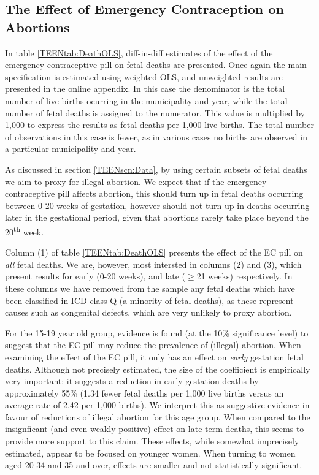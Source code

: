 \subsection{The Effect of Emergency Contraception on Abortions}
\label{TEENsscn:rabortion}
In table \ref{TEENtab:DeathOLS}, diff-in-diff estimates of the effect of the
emergency contraceptive pill on fetal deaths are presented.  Once again the main
specification is estimated using weighted OLS, and unweighted results are
presented in the online appendix. In this case the denominator is the total
number of live births ocurring in the municipality and year, while the total
number of fetal deaths is assigned to the numerator.  This value is multiplied
by 1,000 to express the results as fetal deaths per 1,000 live births. The total
number of observations in this case is fewer, as in various cases no births are
observed in a particular municipality and year.

As discussed in section \ref{TEENscn:Data}, by using certain subsets of fetal
deaths we aim to proxy for illegal abortion.  We expect that if the emergency
contraceptive pill affects abortion, this should turn up in fetal deaths
occurring between 0-20 weeks of gestation, however should not turn up in deaths
occurring later in the gestational period, given that abortions rarely take
place beyond the 20\textsuperscript{th} week.

Column (1) of table \ref{TEENtab:DeathOLS} presents the effect of the EC pill on
\emph{all} fetal deaths.  We are, however, most intersted in columns (2) and (3),
which present results for early (0-20 weeks), and late ($\geq$21 weeks) 
respectively.  In these columns we have removed from the sample any fetal deaths
which have been classified in ICD class Q (a minority of fetal deaths), as these 
represent causes such as congenital defects, which are very unlikely to proxy
abortion.

For the 15-19 year old group, evidence is found (at the 10\% significance level)
to suggest that the EC pill may reduce the prevalence of (illegal) abortion.
When examining the effect of the EC pill, it only has an effect on \emph{early}
gestation fetal deaths.  Although not precisely estimated, the size of the
coefficient is empirically very important: it suggests a reduction in early
gestation deaths by approximately 55\% (1.34 fewer fetal deaths per 1,000 live
births versus an average rate of 2.42 per 1,000 births). We interpret this as
suggestive evidence in favour of reductions of illegal abortion for this age
group.  When compared to the insignficant (and even weakly positive) effect on
late-term deaths, this seems to provide more support to this claim.  These
effects, while somewhat imprecisely estimated, appear to be focused on younger
women. When turning to women aged 20-34 and 35 and over, effects are smaller
and not statistically significant.

